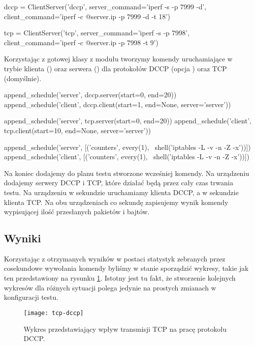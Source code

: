 \documentclass[00-praca-magisterska.tex]{subfiles}
\begin{document}
\begin{pythoncode}
  dccp = ClientServer('dccp',
      server_command='iperf -s -p 7999 -d',
      client_command='iperf -c @{server.ip} -p 7999 -d -t 18')

  tcp = ClientServer('tcp',
      server_command='iperf -s -p 7998',
      client_command='iperf -c @{server.ip} -p 7998 -t 9')
\end{pythoncode}

Korzystając z gotowej klasy  z modułu  tworzymy
komendy uruchamiające  w trybie klienta () oraz serwera
() dla protokołów DCCP (opcja ) oraz TCP (domyślnie).

\begin{pythoncode}
  append_schedule('server', dccp.server(start=0, end=20))
  append_schedule('client', dccp.client(start=1, end=None, server='server'))

  append_schedule('server', tcp.server(start=0, end=20))
  append_schedule('client', tcp.client(start=10, end=None, server='server'))

  append_schedule('server', [('counters', every(1), \
      shell('iptables -L -v -n -Z -x'))])
  append_schedule('client', [('counters', every(1), \
      shell('iptables -L -v -n -Z -x'))])
\end{pythoncode}

Na koniec dodajemy do planu testu stworzone wcześniej komendy. Na urządzeniu
 dodajemy serwery DCCP i TCP, które działać będą przez cały czas
trwania testu. Na urządzeniu \code{client} w \code{1} sekundzie uruchamiamy
klienta DCCP, a w \code{10} sekundzie klienta TCP. Na obu urządzeniach co
sekundę zapisujemy wynik komendy wypisującej ilość przesłanych pakietów i
bajtów.

\subsection{Wyniki}

Korzystając z otrzymanych wyników w postaci statystyk zebranych
przez cosekundowe wywołania komendy  byliśmy w stanie sporządzić
wykresy, takie jak ten przedstawiony na rysunku \ref{fig:tcp-dccp}. Istotny jest
tu fakt, że stworzenie kolejnych wykresów dla różnych sytuacji polega jedynie
na prostych zmianach w konfiguracji testu.

\begin{figure}[htb]
\begin{center}
\leavevmode
\texttt{[image: tcp-dccp]}
\end{center}
\caption{Wykres przedstawiający wpływ transmisji TCP na pracę
protokołu DCCP.}
\label{fig:tcp-dccp}
\end{figure}
\end{document}
